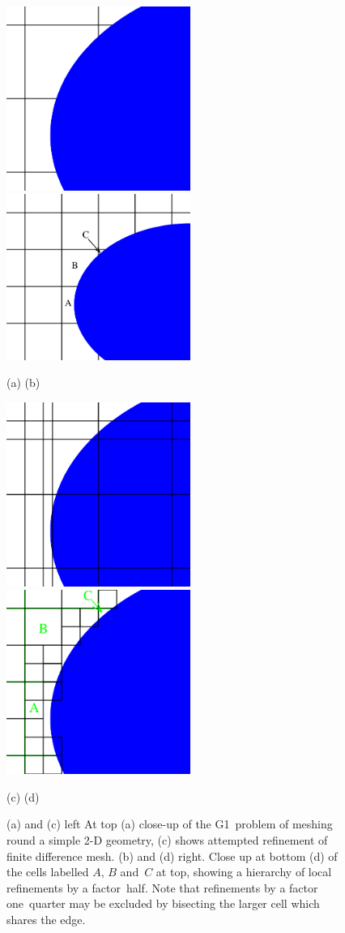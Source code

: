 \begin{figure}
\centerline{\includegraphics[width=6cm]{../pics/dmesh}
\hspace{1cm}\includegraphics[width=6cm]{../pics/meshabc}
}
\centerline{(a) \hspace{7cm}(b)}
\centerline{\includegraphics[width=6cm]{../pics/fd}
\hspace{1cm}\includegraphics[width=6cm]{../pics/mfenabc}
}
\centerline{(c) \hspace{7cm}(d)}
\caption{(a) and (c) left
At top (a) close-up of the G1~problem of meshing round a simple 2-D geometry, (c)
shows attempted refinement of finite difference mesh.
(b) and (d) right. Close up at bottom (d) of the cells labelled $A$, $B$ and~$C$ at top, showing
a hierarchy of local refinements by a factor~half. Note that refinements by a factor one~quarter
may be excluded by bisecting the larger cell which shares the edge.
\label{fig:mfenabc}}
\end{figure}

